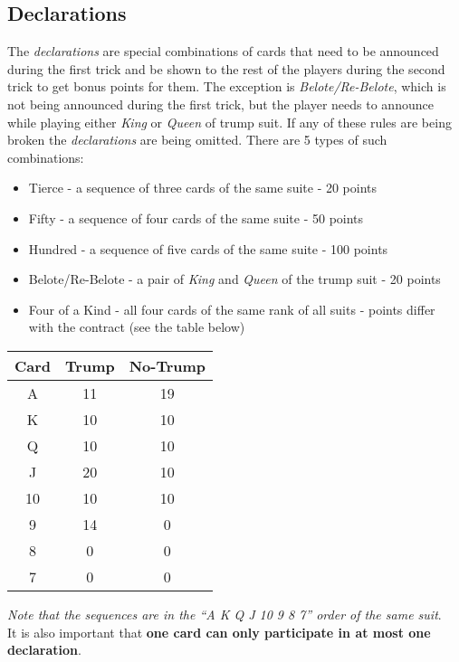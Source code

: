 \subsection{Declarations}
\hspace{\parindent} The \textit{declarations} are special combinations of cards that need to be announced during the first trick and be shown to the rest of the players during the second trick to get bonus points for them.
The exception is \textit{Belote/Re-Belote}, which is not being announced during the first trick, but the player needs to announce while playing either \textit{King} or \textit{Queen} of trump suit.
If any of these rules are being broken the \textit{declarations} are being omitted.
There are 5 types of such combinations:
\begin{itemize}
    \item Tierce - a sequence of three cards of the same suite - 20 points
    \item Fifty - a sequence of four cards of the same suite - 50 points
    \item Hundred - a sequence of five cards of the same suite - 100 points
    \item Belote/Re-Belote - a pair of \textit{King} and \textit{Queen} of the trump suit -  20 points
    \item Four of a Kind - all four cards of the same rank of all suits - points differ with the contract (see the table below)
\end{itemize}

\begin{center}
    \begin{tabular}{|c|c|c|}
        \hline
        \textbf{Card} & \textbf{Trump}  & \textbf{No-Trump}\\
        \hline
        A & 11 & 19\\
        \hline
        K & 10 & 10\\
        \hline
        Q & 10  & 10\\
        \hline
        J & 20 & 10\\
        \hline
        10 & 10 & 10\\
        \hline
        9 & 14 & 0\\
        \hline
        8 & 0 & 0\\
        \hline
        7 & 0 & 0\\
        \hline
    \end{tabular}
\end{center}
\textit{Note that the sequences are in the ``A K Q J 10 9 8 7'' order of the same suit}.\\
It is also important that \textbf{one card can only participate in at most one declaration}.

